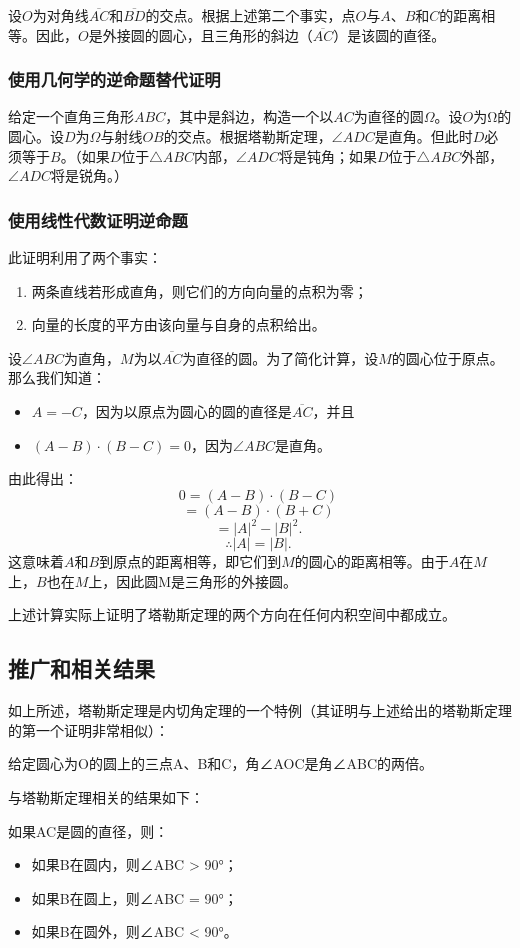 设\(O\)为对角线\(\overline{AC}\)和\(\overline{BD}\)的交点。根据上述第二个事实，点\(O\)与\(A\)、\(B\)和\(C\)的距离相等。因此，\(O\)是外接圆的圆心，且三角形的斜边（\(\overline{AC}\)）是该圆的直径。
\subsubsection{使用几何学的逆命题替代证明} 
给定一个直角三角形\(ABC\)，其中是斜边，构造一个以\(AC\)为直径的圆\(\Omega\)。设\(O\)为Ω的圆心。设\(D\)为\(\Omega\)与射线\(OB\)的交点。根据塔勒斯定理，\(\angle ADC\)是直角。但此时\(D\)必须等于\(B\)。（如果\(D\)位于\(\triangle ABC\)内部，\(\angle ADC\)将是钝角；如果\(D\)位于\(\triangle ABC\)外部，\(\angle ADC\)将是锐角。）
\subsubsection{使用线性代数证明逆命题 } 
此证明利用了两个事实：
\begin{enumerate}
\item 两条直线若形成直角，则它们的方向向量的点积为零；
\item 向量的长度的平方由该向量与自身的点积给出。
\end{enumerate}
设\(\angle ABC\)为直角，\(M\)为以\(\overline{AC}\)为直径的圆。为了简化计算，设\(M\)的圆心位于原点。那么我们知道：
\begin{itemize}
\item \(A = -C\)，因为以原点为圆心的圆的直径是\(\overline{AC}\)，并且  
\item \((A - B) \cdot (B - C) = 0\)，因为\(\angle ABC\)是直角。
\end{itemize}
由此得出：
\[
0 = (A - B) \cdot (B - C)~
\]
\[
= (A - B) \cdot (B + C)~
\]
\[
= |A|^2 - |B|^2.~
\]
\[
\therefore |A| = |B|.~
\]
这意味着\(A\)和\(B\)到原点的距离相等，即它们到\(M\)的圆心的距离相等。由于\(A\)在\(M\)上，\( B\)也在\(M\)上，因此圆M是三角形的外接圆。

上述计算实际上证明了塔勒斯定理的两个方向在任何内积空间中都成立。
\subsection{推广和相关结果}  
如上所述，塔勒斯定理是内切角定理的一个特例（其证明与上述给出的塔勒斯定理的第一个证明非常相似）：

给定圆心为O的圆上的三点A、B和C，角∠AOC是角∠ABC的两倍。

与塔勒斯定理相关的结果如下：

如果AC是圆的直径，则：
\begin{itemize}
\item 如果B在圆内，则∠ABC > 90°；
\item 如果B在圆上，则∠ABC = 90°；
\item 如果B在圆外，则∠ABC < 90°。
\end{itemize}
